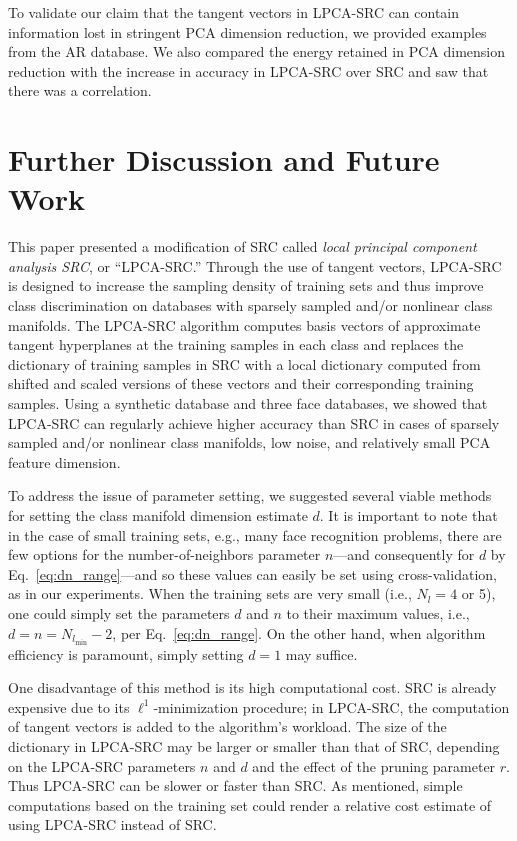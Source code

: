 \documentclass[review]{elsarticle}
\begin{document}
To validate our claim that the tangent vectors in LPCA-SRC can contain information lost in stringent PCA dimension reduction, we provided examples from the AR database. We also compared the energy retained in PCA dimension reduction with the increase in accuracy in LPCA-SRC over SRC and saw that there was a correlation.



\section{Further Discussion and Future Work} \label{sec:fut_work}

This paper presented a modification of SRC called \emph{local principal component analysis SRC}, or ``LPCA-SRC.'' Through the use of tangent vectors, LPCA-SRC is designed to increase the sampling density of training sets and thus improve class discrimination on databases with sparsely sampled and/or nonlinear class manifolds. The LPCA-SRC algorithm computes basis vectors of approximate tangent hyperplanes at the training samples in each class and replaces the dictionary of training samples in SRC with a local dictionary computed from shifted and scaled versions of these vectors and their corresponding training samples. Using a synthetic database and three face databases, we showed that LPCA-SRC can regularly achieve higher accuracy than SRC in cases of sparsely sampled and/or nonlinear class manifolds, low noise, and relatively small PCA feature dimension.

To address the issue of parameter setting, we suggested several viable methods for setting the class manifold dimension estimate $d$. It is important to note that in the case of small training sets, e.g., many face recognition problems, there are few options for the number-of-neighbors parameter $n$---and consequently for $d$ by Eq.~\eqref{eq:dn_range}---and so these values can easily be set using cross-validation, as in our experiments. When the training sets are very small (i.e., $N_l = 4$ or 5), one could simply set the parameters $d$ and $n$ to their maximum values, i.e., $d=n=N_{l_\mathrm{min}}-2$, per Eq.~\eqref{eq:dn_range}. On the other hand, when algorithm efficiency is paramount, simply setting $d=1$ may suffice.

One disadvantage of this method is its high computational cost. SRC is already expensive due to its $\ell^1$-minimization procedure; in LPCA-SRC, the computation of tangent vectors is added to the algorithm's workload. The size of the dictionary in LPCA-SRC may be larger or smaller than that of SRC, depending on the LPCA-SRC parameters $n$ and $d$ and the effect of the pruning parameter $r$. Thus LPCA-SRC can be slower or faster than SRC. As mentioned, simple computations based on the training set could render a relative cost estimate of using LPCA-SRC instead of SRC. 
\end{document}
